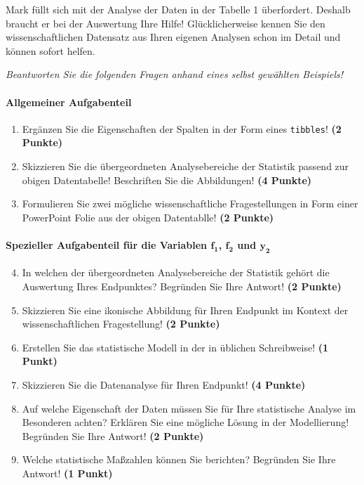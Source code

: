 \documentclass[a4paper, 9pt]{scrartcl}\usepackage[]{graphicx}\usepackage[]{xcolor}
\begin{document}
Mark füllt sich mit der Analyse der Daten in der Tabelle 1 überfordert. Deshalb braucht er bei der Auswertung Ihre Hilfe! Glücklicherweise kennen Sie den wissenschaftlichen Datensatz aus Ihren eigenen Analysen schon im Detail und können sofort helfen.

\begin{graybox}{}
\begin{center}
\textit{Beantworten Sie die folgenden Fragen anhand eines selbst gewählten Beispiels!}
\end{center}
\end{graybox}

\paragraph{Allgemeiner Aufgabenteil} 

\begin{enumerate}
  \setcounter{enumi}{0}
  \item Ergänzen Sie die Eigenschaften der Spalten in der Form eines \texttt{tibbles}! \textbf{(2 Punkte)}
  \item Skizzieren Sie die übergeordneten Analysebereiche der Statistik passend zur obigen Datentabelle! Beschriften Sie die Abbildungen! \textbf{(4 Punkte)}
  \item Formulieren Sie zwei mögliche wissenschaftliche Fragestellungen in Form einer PowerPoint Folie aus der obigen Datentablle! \textbf{(2 Punkte)}
\end{enumerate}

\paragraph{Spezieller Aufgabenteil für die Variablen $\boldsymbol{f_1}$, $\boldsymbol{f_2}$ und $\boldsymbol{y_2}$}

\begin{enumerate}
  \setcounter{enumi}{3}
  \item In welchen der übergeordneten Analysebereiche der Statistik gehört die Auswertung Ihres Endpunktes? Begründen Sie Ihre Antwort! \textbf{(2 Punkte)}
  \item Skizzieren Sie eine ikonische Abbildung für Ihren Endpunkt im Kontext der wissenschaftlichen Fragestellung! \textbf{(2 Punkte)}
  \item Erstellen Sie das statistische Modell in der in \Rlogo üblichen Schreibweise! \textbf{(1 Punkt)}
  \item Skizzieren Sie die Datenanalyse für Ihren Endpunkt! \textbf{(4 Punkte)}
  \item Auf welche Eigenschaft der Daten müssen Sie für Ihre statistische Analyse im Besonderen achten? Erklären Sie eine mögliche Lösung in der Modellierung! Begründen Sie Ihre Antwort! \textbf{(2 Punkte)}
  \item Welche statistische Maßzahlen können Sie berichten? Begründen Sie Ihre Antwort! \textbf{(1 Punkt)}
\end{enumerate}
\end{document}
